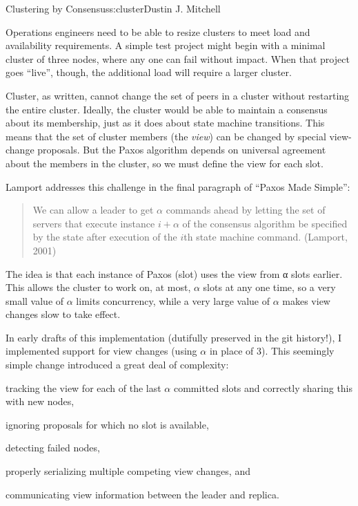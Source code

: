 \begin{aosachapter}{Clustering by Consensus}{s:cluster}{Dustin J. Mitchell}
\label{view-changes}

Operations engineers need to be able to resize clusters to meet load and
availability requirements. A simple test project might begin with a
minimal cluster of three nodes, where any one can fail without impact.
When that project goes ``live'', though, the additional load will
require a larger cluster.

Cluster, as written, cannot change the set of peers in a cluster without
restarting the entire cluster. Ideally, the cluster would be able to
maintain a consensus about its membership, just as it does about state
machine transitions. This means that the set of cluster members (the
\emph{view}) can be changed by special view-change proposals. But the
Paxos algorithm depends on universal agreement about the members in the
cluster, so we must define the view for each slot.

Lamport addresses this challenge in the final paragraph of ``Paxos Made
Simple'':

\begin{quote}
We can allow a leader to get $\alpha$ commands ahead by letting the set
of servers that execute instance $i+\alpha$ of the consensus algorithm
be specified by the state after execution of the $i$th state machine
command. (Lamport, 2001)
\end{quote}

The idea is that each instance of Paxos (slot) uses the view from α
slots earlier. This allows the cluster to work on, at most, $\alpha$
slots at any one time, so a very small value of $\alpha$ limits
concurrency, while a very large value of $\alpha$ makes view changes
slow to take effect.

In early drafts of this implementation (dutifully preserved in the git
history!), I implemented support for view changes (using $\alpha$ in
place of 3). This seemingly simple change introduced a great deal of
complexity:

\begin{aosaitemize}

\item
  tracking the view for each of the last $\alpha$ committed slots and
  correctly sharing this with new nodes,
\item
  ignoring proposals for which no slot is available,
\item
  detecting failed nodes,
\item
  properly serializing multiple competing view changes, and
\item
  communicating view information between the leader and replica.
\end{aosaitemize}


\end{aosachapter}
